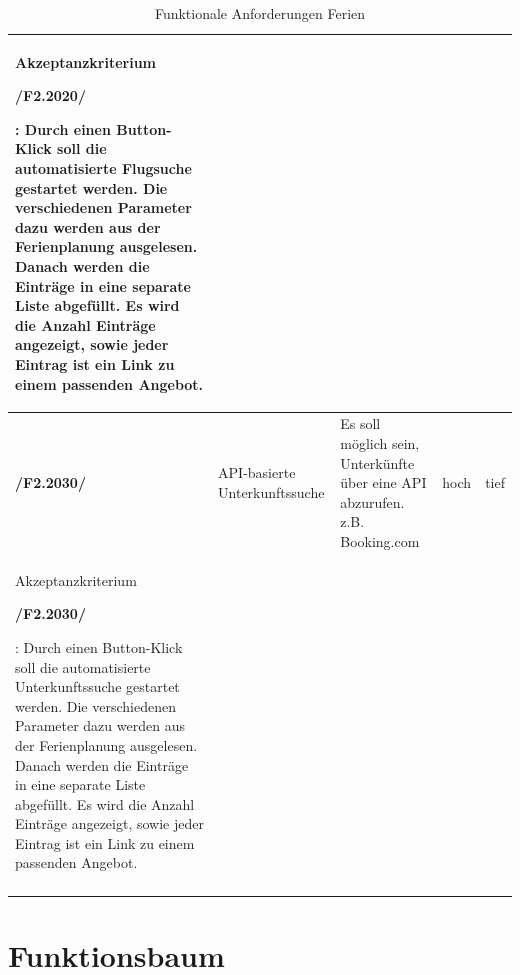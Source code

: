 \documentclass[10pt,a4paper,titlepage,twoside,german,final]{zhawreprt}
\newcommand{\AddRequirement}[2]{
\textbf{/#1#2/}
}
\newcommand{\W}[1]{
\AddRequirement{F2.}{#1}
}
\numberwithin{table}{chapter}
\begin{document}
\begin{center}
\begin{longtable}{l|p{2.5cm}|p{5cm}|p{2cm}|p{1.5cm}}
Akzeptanzkriterium \W{2020}:\linebreak
Durch einen Button-Klick soll die automatisierte Flugsuche gestartet werden. Die verschiedenen Parameter dazu werden aus der Ferienplanung ausgelesen. Danach werden die Einträge in eine separate Liste abgefüllt. Es wird die Anzahl Einträge angezeigt, sowie jeder Eintrag ist ein Link zu einem passenden Angebot.\\\hline
\W{2030} & API-basierte Unterkunftssuche & Es soll möglich sein, Unterkünfte über eine API abzurufen. z.B. Booking.com & hoch & tief\\\hline
Akzeptanzkriterium \W{2030}:\linebreak
Durch einen Button-Klick soll die automatisierte Unterkunftssuche gestartet werden. Die verschiedenen Parameter dazu werden aus der Ferienplanung ausgelesen. Danach werden die Einträge in eine separate Liste abgefüllt. Es wird die Anzahl Einträge angezeigt, sowie jeder Eintrag ist ein Link zu einem passenden Angebot.\\\hline
\caption{Funktionale Anforderungen Ferien}\label{tbl:FuncVacation}
\end{longtable}
\end{center}\newpage

\chapter{Funktionsbaum}\label{chp:FunctionTree}
\begin{minipage}{\textwidth}

\end{minipage}
\end{document}
